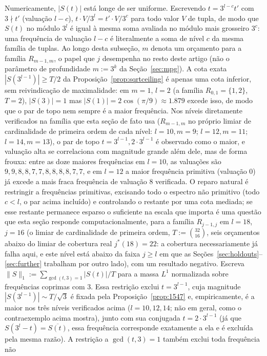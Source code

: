 \documentclass[11pt]{amsart}
\theoremstyle{plain}
\theoremstyle{definition}
\theoremstyle{remark}
\begin{document}
Numericamente, $|S(t)|$ está longe de ser uniforme. Escrevendo $t=3^{l-c}t'$ com $3\nmid t'$
(valuação $l-c$), $t\cdot V/3^l=t'\cdot V/3^c$ para todo valor $V$ de tupla, de modo que $S(t)$ no
módulo $3^l$ é igual à mesma soma avaliada no módulo mais grosseiro $3^c$: uma frequência de
valuação $l-c$ é literalmente a soma de nível $c$ da mesma família de tuplas. Ao longo desta
subseção, $m$ denota um orçamento para a família $R_{m-1,m}$, o papel que $j$ desempenha no resto
deste artigo (não o parâmetro de profundidade $m:=3^k$ da Seção~\ref{sec:mpg}). A cota exata
$|S(3^{l-1})|\ge T/2$ da Proposição~\ref{prop:sqrtceiling} é apenas uma cota inferior, sem
reivindicação de maximalidade: em $m=1$, $l=2$ (a família $R_{0,1}=\{1,2\}$, $T=2$), $|S(3)|=1$
mas $|S(1)|=2\cos(\pi/9)\approx1.879$ excede isso, de modo que o par de topo nem sempre é a maior
frequência. Nos níveis diretamente verificados na família que esta seção de fato usa ($R_{m-1,m}$
no próprio limiar de cardinalidade de primeira ordem de cada nível: $l=10,m=9$; $l=12,m=11$;
$l=14,m=13$), o par de topo $t=3^{l-1},2\cdot3^{l-1}$ é observado como o maior, e valuação alta se
correlaciona com magnitude grande além dele, mas de forma frouxa: entre as doze maiores frequências
em $l=10$, as valuações são $9,9,8,8,7,7,8,8,8,8,7,7$, e em $l=12$ a maior frequência primitiva
(valuação $0$) já excede a mais fraca frequência de valuação $8$ verificada. O reparo natural é
restringir a frequências primitivas, excisando todo o espectro não primitivo (todo $c<l$, o par
acima incluído) e controlando o restante por uma cota mediada; se esse restante permanece esparso o
suficiente na escala que importa é uma questão que esta seção responde computacionalmente, para a
família $R_{j-1,j}$ em $l=18$, $j=16$ (o limiar de cardinalidade de primeira ordem, $T:=\binom{32}{16}$,
seis orçamentos abaixo do limiar de cobertura real $j^*(18)=22$: a cobertura necessariamente já
falha aqui, e este nível está abaixo da faixa $j\ge l$ em que as Seções~\ref{sec:holdouts}--\ref{sec:further}
trabalham por outro lado), com um resultado negativo. Escreva
$\|S\|_1:=\sum_{\gcd(t,3)=1}|S(t)|/T$ para a massa $L^1$ normalizada sobre frequências coprimas com
$3$. Essa restrição exclui $t=3^{l-1}$, cuja magnitude $|S(3^{l-1})|\sim T/\sqrt3$ é fixada pela
Proposição~\ref{prop:1547} e, empiricamente, é a maior nos três níveis verificados acima
($l=10,12,14$; não em geral, como o contraexemplo acima mostra), junto com sua conjugada
$t=2\cdot3^{l-1}$ (já que $S(3^l-t)=\overline{S(t)}$, essa frequência corresponde exatamente a ela
e é excluída pela mesma razão). A restrição a $\gcd(t,3)=1$ também exclui toda frequência não
\end{document}
